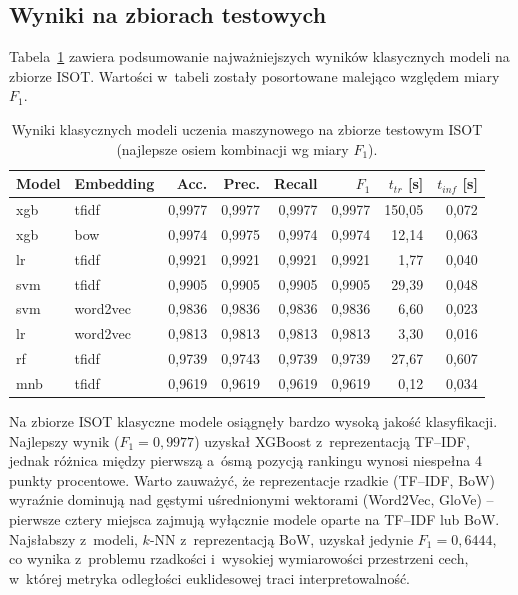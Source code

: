 \subsection{Wyniki na zbiorach testowych}
\label{sec:wyniki_klasyczne_test}

Tabela~\ref{tab:klas_isot} zawiera podsumowanie najważniejszych
wyników klasycznych modeli na zbiorze ISOT. Wartości w~tabeli zostały
posortowane malejąco względem miary $F_1$.

\begin{table}[ht]
\centering
\caption{Wyniki klasycznych modeli uczenia maszynowego na zbiorze
testowym ISOT (najlepsze osiem kombinacji wg miary $F_1$).}
\label{tab:klas_isot}
\begin{tabular}{llrrrrrr}
\toprule
Model & Embedding & Acc. & Prec. & Recall & $F_1$ & $t_{tr}$ [s] & $t_{inf}$ [s] \\
\midrule
xgb & tfidf    & 0,9977 & 0,9977 & 0,9977 & 0,9977 & 150,05 & 0,072 \\
xgb & bow      & 0,9974 & 0,9975 & 0,9974 & 0,9974 & 12,14  & 0,063 \\
lr  & tfidf    & 0,9921 & 0,9921 & 0,9921 & 0,9921 & 1,77   & 0,040 \\
svm & tfidf    & 0,9905 & 0,9905 & 0,9905 & 0,9905 & 29,39  & 0,048 \\
svm & word2vec & 0,9836 & 0,9836 & 0,9836 & 0,9836 & 6,60   & 0,023 \\
lr  & word2vec & 0,9813 & 0,9813 & 0,9813 & 0,9813 & 3,30   & 0,016 \\
rf  & tfidf    & 0,9739 & 0,9743 & 0,9739 & 0,9739 & 27,67  & 0,607 \\
mnb & tfidf    & 0,9619 & 0,9619 & 0,9619 & 0,9619 & 0,12   & 0,034 \\
\bottomrule
\end{tabular}
\end{table}

Na zbiorze ISOT klasyczne modele osiągnęły bardzo wysoką jakość
klasyfikacji. Najlepszy wynik (\(F_1 = 0{,}9977\)) uzyskał XGBoost
z~reprezentacją TF--IDF, jednak różnica między pierwszą a~ósmą pozycją
rankingu wynosi niespełna 4 punkty procentowe. Warto zauważyć, że
reprezentacje rzadkie (TF--IDF, BoW) wyraźnie dominują nad gęstymi
uśrednionymi wektorami (Word2Vec, GloVe) -- pierwsze cztery miejsca
zajmują wyłącznie modele oparte na TF--IDF lub BoW. Najsłabszy z~modeli,
$k$-NN z~reprezentacją BoW, uzyskał jedynie \(F_1 = 0{,}6444\), co
wynika z~problemu rzadkości i~wysokiej wymiarowości przestrzeni cech,
w~której metryka odległości euklidesowej traci interpretowalność.

